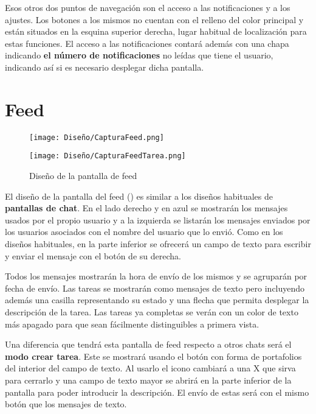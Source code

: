 Esos otros dos puntos de navegación son el acceso a las notificaciones y a los ajustes. Los botones a los mismos no cuentan con el relleno del color principal y están situados en la esquina superior derecha, lugar habitual de localización para estas funciones. El acceso a las notificaciones contará además con una chapa indicando \textbf{el número de notificaciones} no leídas que tiene el usuario, indicando así si es necesario desplegar dicha pantalla.

\section{Feed}

\begin{figure}[H]
    \centering
    \begin{minipage}{0.5\textwidth}
        \centering
        \texttt{[image: Diseño/CapturaFeed.png]}
        \label{scr:feed}
    \end{minipage}\hfill
    \begin{minipage}{0.5\textwidth}
        \centering
        \texttt{[image: Diseño/CapturaFeedTarea.png]}
        \label{scr:feed_task_mode}
    \end{minipage}\hfill
    \caption{Diseño de la pantalla de feed}
\end{figure}

El diseño de la pantalla del feed () es similar a los diseños habituales de \textbf{pantallas de chat}. En el lado derecho y en azul se mostrarán los mensajes usados por el propio usuario y a la izquierda se listarán los mensajes enviados por los usuarios asociados con el nombre del usuario que lo envió. Como en los diseños habituales, en la parte inferior se ofrecerá un campo de texto para escribir y enviar el mensaje con el botón de su derecha.

Todos los mensajes mostrarán la hora de envío de los mismos y se agruparán por fecha de envío. Las tareas se mostrarán como mensajes de texto pero incluyendo además una casilla representando su estado y una flecha que permita desplegar la descripción de la tarea. Las tareas ya completas se verán con un color de texto más apagado para que sean fácilmente distinguibles a primera vista.

Una diferencia que tendrá esta pantalla de feed respecto a otros chats será el \textbf{modo crear tarea}. Este se mostrará usando el botón con forma de portafolios del interior del campo de texto. Al usarlo el icono cambiará a una X que sirva para cerrarlo y una campo de texto mayor se abrirá en la parte inferior de la pantalla para poder introducir la descripción. El envío de estas será con el mismo botón que los mensajes de texto.

